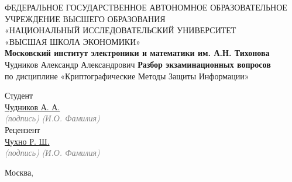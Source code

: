 \begin{titlepage}
    \centering
    {\large
    ФЕДЕРАЛЬНОЕ ГОСУДАРСТВЕННОЕ АВТОНОМНОЕ ОБРАЗОВАТЕЛЬНОЕ УЧРЕЖДЕНИЕ ВЫСШЕГО ОБРАЗОВАНИЯ\\
    «НАЦИОНАЛЬНЫЙ ИССЛЕДОВАТЕЛЬСКИЙ УНИВЕРСИТЕТ\\
    «ВЫСШАЯ ШКОЛА ЭКОНОМИКИ»\\}
    \vspace{1cm}
    {\large\textbf{Московский институт электроники и математики им. А.Н. Тихонова}\\}
    \vspace{1cm}
    {\large Чудников Александр Александрович}
    \vfill
    {\LARGE \textbf{Разбор экзаминационных вопросов}\\}
    \vspace{1cm}
    {\large по дисциплине «Криптографические Методы Защиты Информации»\\}
    \vfill
    \begin{singlespace}
        \begin{multicols}{2}
            \hfill
            \begin{minipage}[t]{0.6\textwidth}
                \begin{flushleft}
                    Студент \\
                    \vspace{1cm}
                    \underline{\hspace{2.5cm}} \hspace{0.2cm} \underline{\hspace{0.5cm}Чудников А. А.\hspace{0.5cm}} \\
                    {\scriptsize\hspace{0.8cm}\textit{\textcolor{gray}{(подпись)}} \hspace{2cm} \textit{\textcolor{gray}{(И.О. Фамилия)}}}\\
                    \vspace{1cm}
                    Рецензент \\
                    \vspace{1cm}
                    \underline{\hspace{2.5cm}} \hspace{0.2cm} \underline{\hspace{0.85cm}Чухно Р. Ш.\hspace{0.85cm}} \\
                    {\scriptsize\hspace{0.8cm}\textit{\textcolor{gray}{(подпись)}} \hspace{2cm} \textit{\textcolor{gray}{(И.О. Фамилия)}}}\\
                    \vspace{1cm}
                \end{flushleft}
            \end{minipage}%
        \end{multicols}
    \end{singlespace}
    \vspace*{1cm}
    {\large Москва, \the\year}
\end{titlepage}
